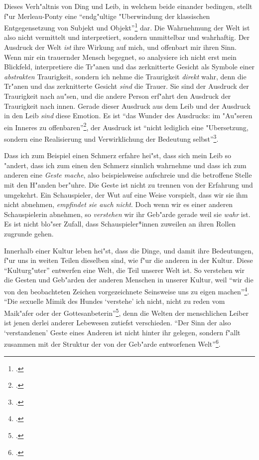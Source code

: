 \documentclass[a4paper, 12pt]{article}
\begin{document}
\begin{onehalfspace}
Dieses Verh"altnis von Ding und Leib, in welchem beide einander bedingen, stellt f"ur Merleau-Ponty eine "`endg"ultige "Uberwindung der klassischen Entgegensetzung von Subjekt und Objekt"'\footnote{\Cite[S. 207]{merleau1966phanomenologie}.} dar. Die Wahrnehmung der Welt ist also nicht vermittelt und interpretiert, sondern unmittelbar und wahrhaftig. Der Ausdruck der Welt \emph{ist} ihre Wirkung auf mich, und offenbart mir ihren Sinn. Wenn mir ein trauernder Mensch begegnet, so analysiere ich nicht erst mein Blickfeld, interpretiere die Tr"anen und das zerknitterte Gesicht als Symbole einer \emph{abstrakten} Traurigkeit, sondern ich nehme die Traurigkeit \emph{direkt} wahr, denn die Tr"anen und das zerknitterte Gesicht \emph{sind} die Trauer. Sie sind der Ausdruck der Traurigkeit nach au"sen, und die andere Person erf"ahrt den Ausdruck der Traurigkeit nach innen. Gerade dieser Ausdruck aus dem Leib und der Ausdruck in den Leib \emph{sind} diese Emotion. Es ist "`das Wunder des Ausdrucks: im "Au"seren ein Inneres zu offenbaren"'\footnote{\Cite[S. 370]{merleau1966phanomenologie}.}, der Ausdruck ist "`nicht lediglich eine "Ubersetzung, sondern eine Realisierung und Verwirklichung der Bedeutung selbst"'\footnote{\Cite[S. 217]{merleau1966phanomenologie}.}. 

Dass ich zum Beispiel einen Schmerz erfahre hei"st, dass sich mein Leib so "andert, dass ich zum einen den Schmerz sinnlich wahrnehme und dass ich zum anderen eine \emph{Geste mache}, also beispielsweise aufschreie und die betroffene Stelle mit den H"anden ber"uhre. Die Geste ist nicht zu trennen von der Erfahrung und umgekehrt. Ein Schauspieler, der Wut auf eine Weise vorspielt, dass wir sie ihm nicht abnehmen, \emph{empfindet sie auch nicht}. Doch wenn wir es einer anderen Schauspielerin abnehmen, so \emph{verstehen} wir ihr Geb"arde gerade weil sie \emph{wahr} ist. Es ist nicht blo"ser Zufall, dass Schauspieler*innen zuweilen an ihren Rollen zugrunde gehen. 

Innerhalb einer Kultur leben hei"st, dass die Dinge, und damit ihre Bedeutungen, f"ur uns in weiten Teilen dieselben sind, wie f"ur die anderen in der Kultur. Diese "`Kulturg"uter"' entwerfen eine Welt, die Teil unserer Welt ist. So verstehen wir die Gesten und Geb"arden der anderen Menschen in unserer Kultur, weil "`wir die von den beobachteten Zeichen vorgezeichnete Seinsweise uns zu eigen machen"'\footnote{\Cite[S. 370]{merleau1966phanomenologie}.}. "`Die sexuelle Mimik des Hundes `verstehe' ich nicht, nicht zu reden vom Maik"afer oder der Gottesanbeterin"'\footnote{\Cite[S. 219]{merleau1966phanomenologie}.}, denn die Welten der menschlichen Leiber ist jenen derlei anderer Lebewesen zutiefst verschieden. "`Der Sinn der also `verstandenen' Geste eines Anderen ist nicht hinter ihr gelegen, sondern f"allt zusammen mit der Struktur der von der Geb"arde entworfenen Welt"'\footnote{\Cite[S. 220]{merleau1966phanomenologie}.}.



\end{onehalfspace}
\end{document}
